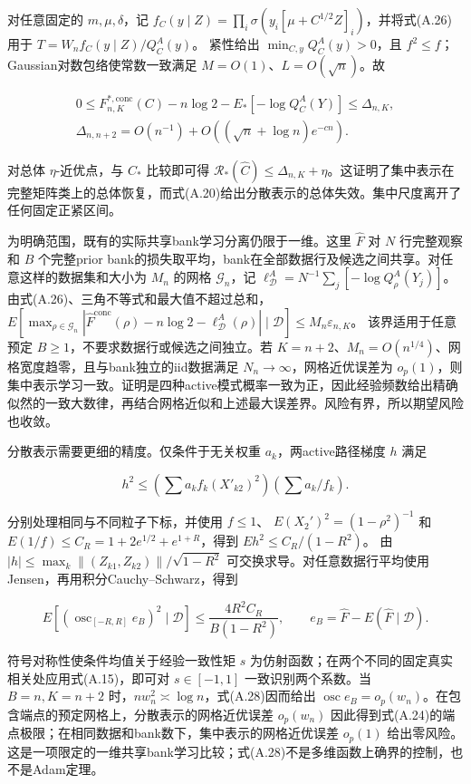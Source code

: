 \documentclass[11pt,a4paper]{article}
\begin{document}
对任意固定的 \(m,\mu,\delta\)，记
\(f_C(y\mid Z)=\prod_i\sigma(y_i[\mu+C^{1/2}Z]_i)\)，并将式(A.26)用于
\(T=W_nf_C(y\mid Z)/Q_C^A(y)\)。 紧性给出 \(\min_{C,y}Q_C^A(y)>0\)，且
\(f^2\le f\)；Gaussian对数包络使常数一致满足
\(M=O(1)\)、\(L=O(\sqrt n)\)。故

\[
\begin{gathered}
0\le F_{n,K}^{*,\mathrm{conc}}(C)-n\log2-E_*[-\log Q_C^A(Y)]
\le\Delta_{n,K},\\
\Delta_{n,n+2}=O(n^{-1})+O((\sqrt n+\log n)e^{-cn}).
\end{gathered}
\tag{A.27}
\]

对总体 \(\eta\)-近优点，与 \(C_*\) 比较即可得
\(\mathcal R_*(\widehat C)\le\Delta_{n,K}+\eta\)。这证明了集中表示在完整矩阵类上的总体恢复，而式(A.20)给出分散表示的总体失效。集中尺度离开了任何固定正紧区间。

为明确范围，既有的实际共享bank学习分离仍限于一维。这里 \(\widehat F\) 对
\(N\) 行完整观察和 \(B\) 个完整prior
bank的损失取平均，bank在全部数据行及候选之间共享。对任意这样的数据集和大小为
\(M_n\) 的网格 \(\mathcal G_n\)，记
\(\ell_{\mathcal D}^{A}=N^{-1}\sum_j[-\log Q_\rho^A(Y_j)]\)。由式(A.26)、三角不等式和最大值不超过总和，
\(E[\max_{\rho\in\mathcal G_n}|\widehat F^{\mathrm{conc}}(\rho)-n\log2-\ell_{\mathcal D}^{A}(\rho)|\mid\mathcal D]\le M_n\varepsilon_{n,K}\)。
该界适用于任意预定 \(B\ge1\)，不要求数据行或候选之间独立。若
\(K=n+2\)、\(M_n=O(n^{1/4})\)、网格宽度趋零，且与bank独立的iid数据满足
\(N_n\to\infty\)，网格近优误差为
\(o_p(1)\)，则集中表示学习一致。证明是四种active模式概率一致为正，因此经验频数给出精确似然的一致大数律，再结合网格近似和上述最大误差界。风险有界，所以期望风险也收敛。

分散表示需要更细的精度。仅条件于无关权重 \(a_k\)，两active路径梯度 \(h\)
满足

\[
h^2\le(\sum a_kf_k(X'_{k2})^2)(\sum a_k/f_k).
\]

分别处理相同与不同粒子下标，并使用 \(f\le1\)、
\(E(X_2')^2=(1-\rho^2)^{-1}\) 和
\(E(1/f)\le C_R=1+2e^{1/2}+e^{1+R}\)，得到 \(Eh^2\le C_R/(1-R^2)\)。 由
\(|h|\le\max_k\|(Z_{k1},Z_{k2})\|/\sqrt{1-R^2}\)
可交换求导。对任意数据行平均使用Jensen，再用积分Cauchy--Schwarz，得到

\[
E[(\operatorname{osc}_{[-R,R]}e_B)^2\mid\mathcal D]
\le\frac{4R^2C_R}{B(1-R^2)},\qquad
e_B=\widehat F-E(\widehat F\mid\mathcal D).
\tag{A.28}
\]

符号对称性使条件均值关于经验一致性矩 \(s\)
为仿射函数；在两个不同的固定真实相关处应用式(A.15)，即可对
\(s\in[-1,1]\) 一致识别两个系数。当 \(B=n,K=n+2\)
时，\(nw_n^2\asymp\log n\)，式(A.28)因而给出
\(\operatorname{osc}e_B=o_p(w_n)\)。在包含端点的预定网格上，分散表示的网格近优误差
\(o_p(w_n)\)
因此得到式(A.24)的端点极限；在相同数据和bank数下，集中表示的网格近优误差
\(o_p(1)\)
给出零风险。这是一项限定的一维共享bank学习比较；式(A.28)不是多维函数上确界的控制，也不是Adam定理。
\end{document}
